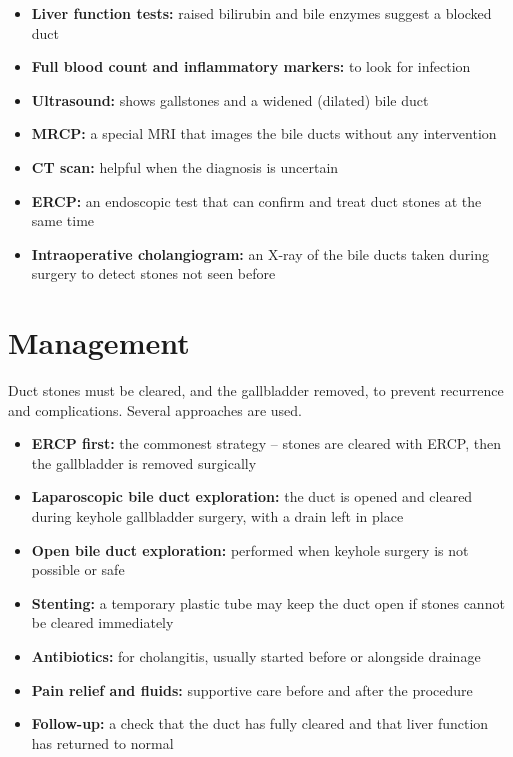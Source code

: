 \begin{itemize}
    \item \textbf{Liver function tests:} raised bilirubin and bile enzymes suggest a blocked duct
    \item \textbf{Full blood count and inflammatory markers:} to look for infection
    \item \textbf{Ultrasound:} shows gallstones and a widened (dilated) bile duct
    \item \textbf{MRCP:} a special MRI that images the bile ducts without any intervention
    \item \textbf{CT scan:} helpful when the diagnosis is uncertain
    \item \textbf{ERCP:} an endoscopic test that can confirm and treat duct stones at the same time
    \item \textbf{Intraoperative cholangiogram:} an X-ray of the bile ducts taken during surgery to detect stones not seen before
\end{itemize}

\section*{Management}
Duct stones must be cleared, and the gallbladder removed, to prevent recurrence and complications. Several approaches are used.

\begin{itemize}
    \item \textbf{ERCP first:} the commonest strategy -- stones are cleared with ERCP, then the gallbladder is removed surgically
    \item \textbf{Laparoscopic bile duct exploration:} the duct is opened and cleared during keyhole gallbladder surgery, with a drain left in place
    \item \textbf{Open bile duct exploration:} performed when keyhole surgery is not possible or safe
    \item \textbf{Stenting:} a temporary plastic tube may keep the duct open if stones cannot be cleared immediately
    \item \textbf{Antibiotics:} for cholangitis, usually started before or alongside drainage
    \item \textbf{Pain relief and fluids:} supportive care before and after the procedure
    \item \textbf{Follow-up:} a check that the duct has fully cleared and that liver function has returned to normal
\end{itemize}

